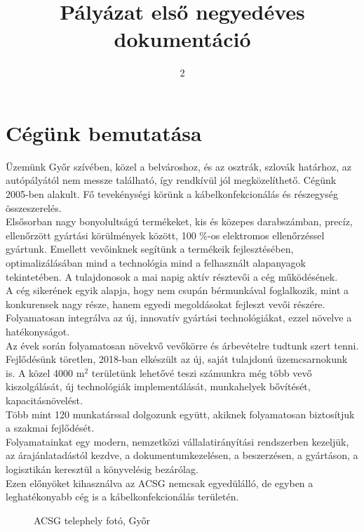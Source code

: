 \documentclass{article}
\title{Pályázat első negyedéves dokumentáció}
\author{}
\date{2}
\begin{document}

\maketitle
\thispagestyle{empty}
\setcounter{page}{0}




\newpage
\tableofcontents
\newpage
\section{Cégünk bemutatása}
Üzemünk Győr szívében, közel a belvároshoz, és az osztrák, szlovák határhoz, az autópályától nem messze található, így rendkívül jól megközelíthető. Cégünk 2005-ben alakult. Fő tevekénységi körünk a kábelkonfekcionálás és részegység összeszerelés.\vspace{10pt}\\
Elsősorban nagy bonyolultságú termékeket, kis és közepes darabszámban, precíz, ellenőrzött gyártási körülmények között, 100 $\%$-os elektromos ellenőrzéssel gyártunk. Emellett vevőinknek segítünk a termékeik fejlesztésében, optimalizálásában mind a technológia mind a felhasznált alapanyagok tekintetében. A tulajdonosok a mai napig aktív résztevői a cég működésének.\vspace{10pt}\\
A cég sikerének egyik alapja, hogy nem csupán bérmunkával foglalkozik, mint a konkurensek nagy része, hanem egyedi megoldásokat fejleszt vevői részére. Folyamatosan integrálva az új, innovatív gyártási technológiákat, ezzel növelve a hatékonyságot.\vspace{10pt}\\
Az évek során folyamatosan növekvő vevőkörre és árbevételre tudtunk szert tenni. Fejlődésünk töretlen, 2018-ban elkészült az új, saját tulajdonú üzemcsarnokunk is. A közel 4000 $\text{m}^2$ területünk lehetővé teszi számunkra még több vevő kiszolgálását, új technológiák implementálását, munkahelyek bővítését, kapacitásnövelést.\vspace{10pt}\\
Több mint 120 munkatárssal dolgozunk együtt, akiknek folyamatosan biztosítjuk a szakmai fejlődését.\vspace{10pt}\\
Folyamatainkat egy modern, nemzetközi vállalatirányítási rendszerben kezeljük, az árajánlatadástól kezdve, a dokumentumkezelésen, a beszerzésen, a gyártáson, a logisztikán keresztül a könyvelésig bezárólag.\vspace{10pt}\\
Ezen előnyöket kihasználva az ACSG nemcsak egyedülálló, de egyben a leghatékonyabb cég is a kábelkonfekcionálás területén.
\begin{figure}[h]
    \centering
    \caption{ACSG telephely fotó, Győr}
\end{figure}\\
\end{document}
